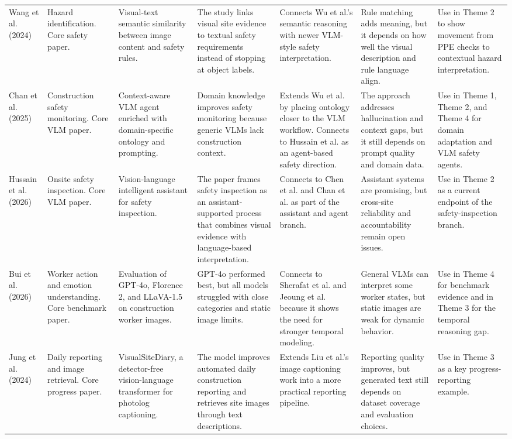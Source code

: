 \documentclass[10pt, letterpaper]{article}
\begin{document}
\begin{landscape}
\begin{longtable}{L{3.0cm} L{2.2cm} L{2.5cm} L{2.9cm} L{3.5cm} L{3.6cm} L{3.2cm}}
Wang et al. (2024) & Hazard identification. Core safety paper. & Visual-text semantic similarity between image content and safety rules. & The study links visual site evidence to textual safety requirements instead of stopping at object labels. & Connects Wu et al.'s semantic reasoning with newer VLM-style safety interpretation. & Rule matching adds meaning, but it depends on how well the visual description and rule language align. & Use in Theme 2 to show movement from PPE checks to contextual hazard interpretation. \\

Chan et al. (2025) & Construction safety monitoring. Core VLM paper. & Context-aware VLM agent enriched with domain-specific ontology and prompting. & Domain knowledge improves safety monitoring because generic VLMs lack construction context. & Extends Wu et al. by placing ontology closer to the VLM workflow. Connects to Hussain et al. as an agent-based safety direction. & The approach addresses hallucination and context gaps, but it still depends on prompt quality and domain data. & Use in Theme 1, Theme 2, and Theme 4 for domain adaptation and VLM safety agents. \\

Hussain et al. (2026) & Onsite safety inspection. Core VLM paper. & Vision-language intelligent assistant for safety inspection. & The paper frames safety inspection as an assistant-supported process that combines visual evidence with language-based interpretation. & Connects to Chen et al. and Chan et al. as part of the assistant and agent branch. & Assistant systems are promising, but cross-site reliability and accountability remain open issues. & Use in Theme 2 as a current endpoint of the safety-inspection branch. \\

Bui et al. (2026) & Worker action and emotion understanding. Core benchmark paper. & Evaluation of GPT-4o, Florence 2, and LLaVA-1.5 on construction worker images. & GPT-4o performed best, but all models struggled with close categories and static image limits. & Connects to Sherafat et al. and Jeoung et al. because it shows the need for stronger temporal modeling. & General VLMs can interpret some worker states, but static images are weak for dynamic behavior. & Use in Theme 4 for benchmark evidence and in Theme 3 for the temporal reasoning gap. \\

Jung et al. (2024) & Daily reporting and image retrieval. Core progress paper. & VisualSiteDiary, a detector-free vision-language transformer for photolog captioning. & The model improves automated daily construction reporting and retrieves site images through text descriptions. & Extends Liu et al.'s image captioning work into a more practical reporting pipeline. & Reporting quality improves, but generated text still depends on dataset coverage and evaluation choices. & Use in Theme 3 as a key progress-reporting example. \\


\end{longtable}
\end{landscape}
\end{document}
